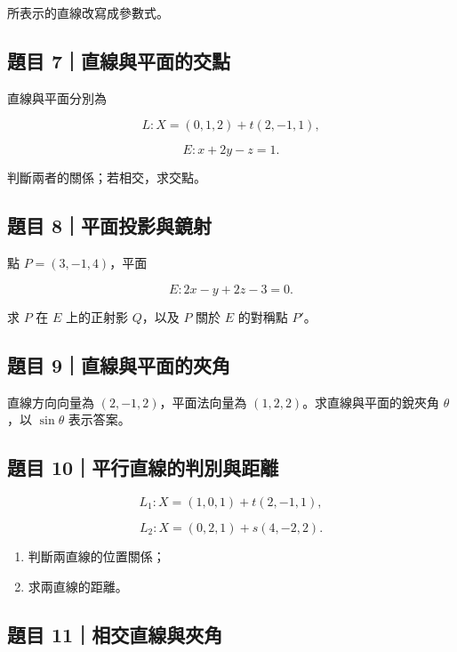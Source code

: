 \documentclass[11pt,a4paper]{article}
\providecommand{\tightlist}{%
  \setlength{\itemsep}{0pt}\setlength{\parskip}{0pt}}
\begin{document}
所表示的直線改寫成參數式。

\subsection{題目 7｜直線與平面的交點}\label{ux984cux76ee-7ux76f4ux7ddaux8207ux5e73ux9762ux7684ux4ea4ux9ede}

直線與平面分別為

\[
L:X=(0,1,2)+t(2,-1,1),
\]

\[
E:x+2y-z=1.
\]

判斷兩者的關係；若相交，求交點。

\subsection{題目 8｜平面投影與鏡射}\label{ux984cux76ee-8ux5e73ux9762ux6295ux5f71ux8207ux93e1ux5c04}

點 \(P=(3,-1,4)\)，平面

\[
E:2x-y+2z-3=0.
\]

求 \(P\) 在 \(E\) 上的正射影 \(Q\)，以及 \(P\) 關於 \(E\) 的對稱點 \(P'\)。

\subsection{題目 9｜直線與平面的夾角}\label{ux984cux76ee-9ux76f4ux7ddaux8207ux5e73ux9762ux7684ux593eux89d2}

直線方向向量為 \((2,-1,2)\)，平面法向量為 \((1,2,2)\)。求直線與平面的銳夾角 \(\theta\)，以 \(\sin\theta\) 表示答案。

\subsection{題目 10｜平行直線的判別與距離}\label{ux984cux76ee-10ux5e73ux884cux76f4ux7ddaux7684ux5224ux5225ux8207ux8dddux96e2}

\[
L_1:X=(1,0,1)+t(2,-1,1),
\]

\[
L_2:X=(0,2,1)+s(4,-2,2).
\]

\begin{enumerate}
\def\labelenumi{\arabic{enumi}.}
\tightlist
\item
  判斷兩直線的位置關係；
\item
  求兩直線的距離。
\end{enumerate}

\subsection{題目 11｜相交直線與夾角}\label{ux984cux76ee-11ux76f8ux4ea4ux76f4ux7ddaux8207ux593eux89d2}
\end{document}
